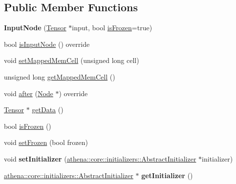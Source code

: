 \subsection*{Public Member Functions}
\begin{DoxyCompactItemize}
\item 
\mbox{\label{classathena_1_1core_1_1_input_node_a14987336678cfcbc2ddbd3f6b67bb572}} 
{\bfseries Input\+Node} (\mbox{\hyperlink{classathena_1_1core_1_1_tensor}{Tensor}} $\ast$input, bool \mbox{\hyperlink{classathena_1_1core_1_1_input_node_a4be7482bcf2e56ea3fd03a2bf79be074}{is\+Frozen}}=true)
\item 
bool \mbox{\hyperlink{classathena_1_1core_1_1_input_node_a2548b569a336b75c0005295833052979}{is\+Input\+Node}} () override
\item 
void \mbox{\hyperlink{classathena_1_1core_1_1_input_node_a8c17ce96d989454e6316c1c049c2c98d}{set\+Mapped\+Mem\+Cell}} (unsigned long cell)
\item 
unsigned long \mbox{\hyperlink{classathena_1_1core_1_1_input_node_acebc0cbf077eaae99f5c11cfba608533}{get\+Mapped\+Mem\+Cell}} ()
\item 
void \mbox{\hyperlink{classathena_1_1core_1_1_input_node_aaec12f4c76b6d9890efe1fb4337a1b61}{after}} (\mbox{\hyperlink{classathena_1_1core_1_1_node}{Node}} $\ast$) override
\item 
\mbox{\hyperlink{classathena_1_1core_1_1_tensor}{Tensor}} $\ast$ \mbox{\hyperlink{classathena_1_1core_1_1_input_node_a983588a56beeb817a59cf9b7e4a63b55}{get\+Data}} ()
\item 
bool \mbox{\hyperlink{classathena_1_1core_1_1_input_node_a4be7482bcf2e56ea3fd03a2bf79be074}{is\+Frozen}} ()
\item 
void \mbox{\hyperlink{classathena_1_1core_1_1_input_node_a45311e1bbff5dd28df3c3877aaa10109}{set\+Frozen}} (bool frozen)
\item 
\mbox{\label{classathena_1_1core_1_1_input_node_a165dadd24956ef927c4342e9d365c46d}} 
void {\bfseries set\+Initializer} (\mbox{\hyperlink{classathena_1_1core_1_1initializers_1_1_abstract_initializer}{athena\+::core\+::initializers\+::\+Abstract\+Initializer}} $\ast$initializer)
\item 
\mbox{\label{classathena_1_1core_1_1_input_node_a1032db02e6706b02b8bb72d68709402b}} 
\mbox{\hyperlink{classathena_1_1core_1_1initializers_1_1_abstract_initializer}{athena\+::core\+::initializers\+::\+Abstract\+Initializer}} $\ast$ {\bfseries get\+Initializer} ()
\end{DoxyCompactItemize}
